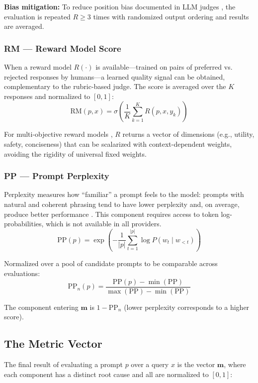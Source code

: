 \documentclass[11pt,a4paper]{article}
\begin{document}
\noindent \textbf{Bias mitigation:} To reduce position bias documented in LLM judges \citep{geval2023}, the evaluation is repeated $R \geq 3$ times with randomized output ordering and results are averaged.

\subsubsection{RM — Reward Model Score}

When a reward model $R(\cdot)$ is available—trained on pairs of preferred vs. rejected responses by humans—a learned quality signal can be obtained, complementary to the rubric-based judge. The score is averaged over the $K$ responses and normalized to $[0,1]$:
\[
\mathrm{RM}(p, x) = \sigma\left(\frac{1}{K} \sum_{k=1}^{K} R(p, x, y_k)\right)
\]

For multi-objective reward models \citep{armorm2024}, $R$ returns a vector of dimensions (e.g., utility, safety, conciseness) that can be scalarized with context-dependent weights, avoiding the rigidity of universal fixed weights.

\subsubsection{PP — Prompt Perplexity}

Perplexity measures how ``familiar'' a prompt feels to the model: prompts with natural and coherent phrasing tend to have lower perplexity and, on average, produce better performance \citep{promptperplexity2022}. This component requires access to token log-probabilities, which is not available in all providers.
\[
\mathrm{PP}(p) = \exp\!\left(-\frac{1}{|p|} \sum_{t=1}^{|p|} \log P(w_t \mid w_{<t})\right)
\]

Normalized over a pool of candidate prompts to be comparable across evaluations:
\[
\mathrm{PP}_n(p) = \frac{\mathrm{PP}(p) - \min(\mathrm{PP})}{\max(\mathrm{PP}) - \min(\mathrm{PP})}
\]

The component entering $\mathbf{m}$ is $1 - \mathrm{PP}_n$ (lower perplexity corresponds to a higher score).

\subsection{The Metric Vector}

The final result of evaluating a prompt $p$ over a query $x$ is the vector $\mathbf{m}$, where each component has a distinct root cause and all are normalized to $[0, 1]$:
\end{document}
